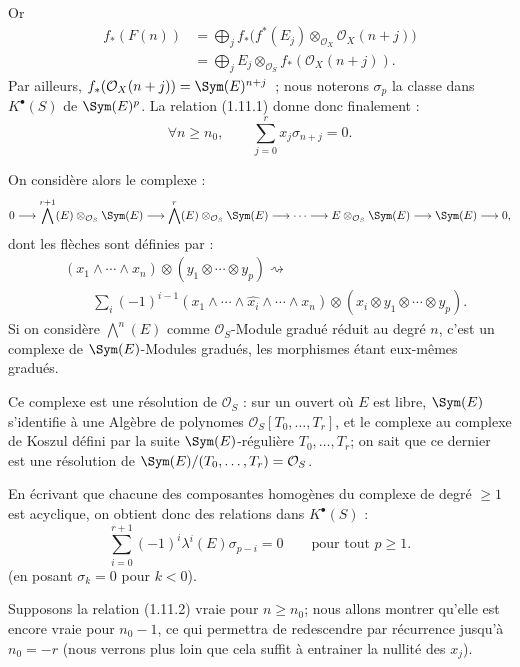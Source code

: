 Or
\[
\begin{aligned}
  f_*(F(n))
  &=\bigoplus_j f_*\bigl(f^*(E_j)\otimes_{\mathcal O_X}\mathcal O_X(n+j)\bigr)\\
  &=\bigoplus_j E_j\otimes_{\mathcal O_S} f_*(\mathcal O_X(n+j)).
\end{aligned}
\]
Par
ailleurs, \(f_*(\mathcal O_X(n+j))=\Sym(E)^{n+j}\)~; nous noterons \(\sigma_p\) la classe dans \(K^{\bullet}(S)\) de \(\Sym(E)^p\). La relation (1.11.1) donne donc finalement :
\begin{equation}\tag{1.11.2}
  \forall n\geq n_0,
  \qquad
  \sum_{j=0}^r x_j\sigma_{n+j}=0.
\end{equation}

On considère alors le complexe :
\[
  0\longrightarrow \bigwedge^{r+1}(E)\otimes_{\mathcal O_S}\Sym(E)
  \longrightarrow \bigwedge^r(E)\otimes_{\mathcal O_S}\Sym(E)
  \longrightarrow\cdots\longrightarrow
  E\otimes_{\mathcal O_S}\Sym(E)
  \longrightarrow \Sym(E)\longrightarrow0,
\]
dont les flèches sont définies par :
\[
\begin{aligned}
&(x_1\wedge\cdots\wedge x_n)\otimes(y_1\otimes\cdots\otimes y_p)\rightsquigarrow{}\\
&\qquad \sum_i(-1)^{i-1}(x_1\wedge\cdots\wedge\widehat{x_i}\wedge\cdots\wedge x_n)
\otimes(x_i\otimes y_1\otimes\cdots\otimes y_p).
\end{aligned}
\]
Si on considère \(\bigwedge^n(E)\) comme \(\mathcal O_S\)-Module gradué réduit au degré \(n\), c'est un complexe de \(\Sym(E)\)-Modules gradués, les morphismes étant eux-mêmes gradués.

Ce complexe est une résolution de \(\mathcal O_S\) : sur un ouvert où \(E\) est libre, \(\Sym(E)\) s'identifie à une Algèbre de polynomes \(\mathcal O_S[T_0,\ldots,T_r]\), et le complexe au complexe de Koszul défini par la suite \(\Sym(E)\)-régulière \(T_0,\ldots,T_r\); on sait que ce dernier est une résolution de \(\Sym(E)/(T_0,\ldots,T_r)=\mathcal O_S\).

En écrivant que chacune des composantes homogènes du complexe de degré \(\geq1\) est acyclique, on obtient donc des relations dans \(K^{\bullet}(S)\) :
\begin{equation}\tag{1.11.3}
  \sum_{i=0}^{r+1}(-1)^i\lambda^i(E)\sigma_{p-i}=0
  \qquad\text{pour tout }p\geq1.
\end{equation}
(en posant \(\sigma_k=0\) pour \(k<0\)).

Supposons la relation (1.11.2) vraie pour \(n\geq n_0\); nous allons montrer qu'elle est encore vraie pour \(n_0-1\), ce qui permettra de redescendre par récurrence jusqu'à \(n_0=-r\) (nous verrons plus loin que cela suffit à entrainer la nullité des \(x_j\)).

